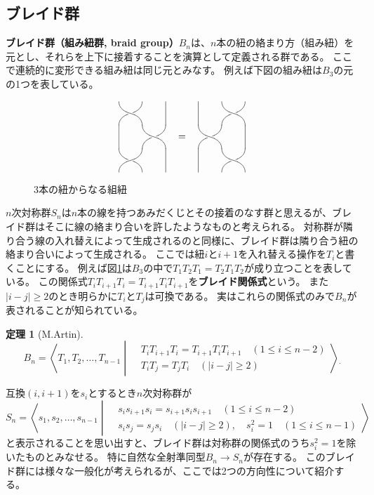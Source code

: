\documentclass[uplatex,11pt,a4paper,dvipdfmx]{jsarticle}
\numberwithin{equation}{section}
\numberwithin{figure}{section}
\theoremstyle{definition}
\newtheorem{theorem}{定理}[section]
\begin{document}
\subsection{ブレイド群}
\textbf{ブレイド群（組み紐群, braid group）}$B_n$は、$n$本の紐の絡まり方（組み紐）を元とし、それらを上下に接着することを演算として定義される群である。
ここで連続的に変形できる組み紐は同じ元とみなす。
例えば下図の組み紐は$B_3$の元の1つを表している。
\begin{figure}[h]
    \[
        \vcenter{\xy 0;/r2pc/:
        @={(0.5,-0.5),(0,0)}, @@{*{\vtwistneg}},(0,-2),\vtwist,
        @i@={(0,-1),(2,0),(2,-2)} @@{="save";"save"-(0,1),**@{-}}\endxy}
        \quad = \quad
        \vcenter{\xy 0;/r2pc/:
        @={(0.5,0),(0,-0.5),(0.5,-1)}, @@{*{\vtwistneg}},
        @i@={(0,0),(2,-1),(0,-2)} @@{="save";"save"-(0,1),**@{-}}\endxy}
    \]
    \caption{3本の紐からなる組紐}
    \label{fig:example-of-braid}
\end{figure}
$n$次対称群$S_n$は$n$本の線を持つあみだくじとその接着のなす群と思えるが、ブレイド群はそこに線の絡まり合いを許したようなものと考えられる。
対称群が隣り合う線の入れ替えによって生成されるのと同様に、ブレイド群は隣り合う紐の絡まり合いによって生成される。
ここでは紐$i$と$i+1$を入れ替える操作を$T_i$と書くことにする。
例えば図\ref{fig:example-of-braid}は$B_3$の中で$T_1T_2T_1 = T_2T_1T_2$が成り立つことを表している。
この関係式$T_iT_{i+1}T_i = T_{i+1}T_iT_{i+1}$を\textbf{ブレイド関係式}という。
また$|i-j| \geq 2$のとき明らかに$T_i$と$T_j$は可換である。
実はこれらの関係式のみで$B_n$が表されることが知られている。
\begin{theorem}[M.Artin]\label{thm:braid-group-as-artin-group}
    \begin{equation}
        B_n = \left\langle T_1, T_2, \dots, T_{n-1} \middle| \begin{split}
            &T_iT_{i+1}T_i = T_{i+1}T_iT_{i+1} \quad(1\leq i \leq n-2)\\
            &T_iT_j = T_jT_i\quad (|i-j| \geq 2)
        \end{split}\right\rangle {}_.
    \end{equation}
\end{theorem}
互換$(i, i+1)$を$s_i$とするとき$n$次対称群が
\begin{equation}
    S_n = \left\langle s_1, s_2, \dots, s_{n-1} \middle| \begin{split}
          &s_is_{i+1}s_i = s_{i+1}s_is_{i+1} \quad(1\leq i \leq n-2)\\
          &s_is_j = s_js_i\quad (|i-j| \geq 2), \quad s_i^2 = 1 \quad (1 \leq i \leq n-1)
      \end{split}\right\rangle
\end{equation}
と表示されることを思い出すと、ブレイド群は対称群の関係式のうち$s_i^2 = 1$を除いたものとみなせる。
特に自然な全射準同型$B_n \to S_n$が存在する。
このブレイド群には様々な一般化が考えられるが、ここでは2つの方向性について紹介する。
\end{document}
